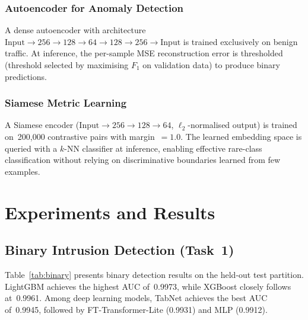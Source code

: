 \documentclass[conference]{IEEEtran}
\begin{document}
\subsubsection{Autoencoder for Anomaly Detection}
A dense autoencoder with architecture
\mbox{$\text{Input}\!\to\!256\!\to\!128\!\to\!64\!\to\!128\!\to\!256\!\to\!\text{Input}$}
is trained exclusively on benign traffic.  At inference, the per-sample MSE
reconstruction error is thresholded (threshold selected by maximising
$F_1$ on validation data) to produce binary predictions.

\subsubsection{Siamese Metric Learning}
A Siamese encoder ($\text{Input}\!\to\!256\!\to\!128\!\to\!64$, $\ell_2$-normalised
output) is trained on~200{,}000 contrastive pairs with margin~$=1.0$.
The learned embedding space is queried with a $k$-NN classifier at inference,
enabling effective rare-class classification without relying on discriminative
boundaries learned from few examples.

\section{Experiments and Results}

\subsection{Binary Intrusion Detection (Task~1)}

Table~\ref{tab:binary} presents binary detection results on the held-out test
partition.  LightGBM achieves the highest AUC of~0.9973, while XGBoost closely
follows at~0.9961.  Among deep learning models, TabNet achieves the best AUC
of~0.9945, followed by FT-Transformer-Lite (0.9931) and MLP (0.9912).
\end{document}
